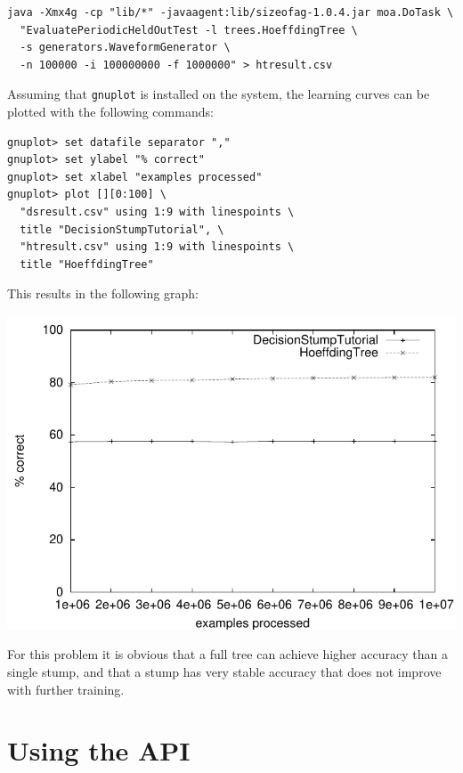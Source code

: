 \documentclass[a4paper,12pt,twoside]{book}
\begin{document}
\begin{footnotesize}\begin{verbatim}
java -Xmx4g -cp "lib/*" -javaagent:lib/sizeofag-1.0.4.jar moa.DoTask \
  "EvaluatePeriodicHeldOutTest -l trees.HoeffdingTree \
  -s generators.WaveformGenerator \
  -n 100000 -i 100000000 -f 1000000" > htresult.csv
\end{verbatim}\end{footnotesize}

Assuming that \verb+gnuplot+ is installed on the system, the learning curves can be plotted with the following commands:

\begin{footnotesize}\begin{verbatim}
gnuplot> set datafile separator ","
gnuplot> set ylabel "% correct"
gnuplot> set xlabel "examples processed"
gnuplot> plot [][0:100] \
  "dsresult.csv" using 1:9 with linespoints \
  title "DecisionStumpTutorial", \
  "htresult.csv" using 1:9 with linespoints \
  title "HoeffdingTree"
\end{verbatim}\end{footnotesize}

This results in the following graph:

\includegraphics{figures/gnuplotGraph}

For this problem it is obvious that a full tree can achieve higher accuracy than a single stump, and that a stump has very stable accuracy that does not improve with further training.



\chapter{Using the API} %
\end{document}
